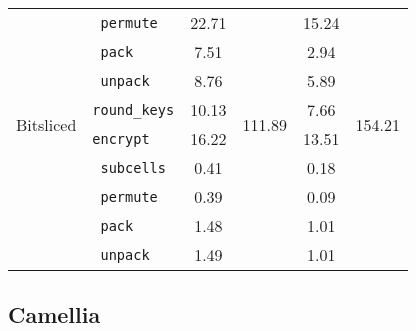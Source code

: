 \begin{table}[h!]
\begin{tabular}{llcccc}
                                              & \texttt{ permute} & 22.71 & & 15.24 & \\
                                              & \texttt{ pack} & 7.51 & & 2.94 & \\
                                              & \texttt{ unpack} & 8.76 & & 5.89 & \\
        \midrule
        \multirow{2}{*}{Bitsliced} & \texttt{round\_keys} & 10.13 & \multirow{2}{*}{111.89} & 7.66 & \multirow{2}{*}{154.21} \\
                                   & \texttt{encrypt} & 16.22 & & 13.51 & \\
        \cmidrule(lr){2-2}
                                   & \texttt{ subcells} & 0.41 & & 0.18 & \\
                                   & \texttt{ permute} & 0.39 & & 0.09 & \\
                                   & \texttt{ pack} & 1.48 & & 1.01 & \\
                                   & \texttt{ unpack} & 1.49 & & 1.01 & \\
        \bottomrule
    \end{tabular}
\end{table}

\subsection{Camellia}

